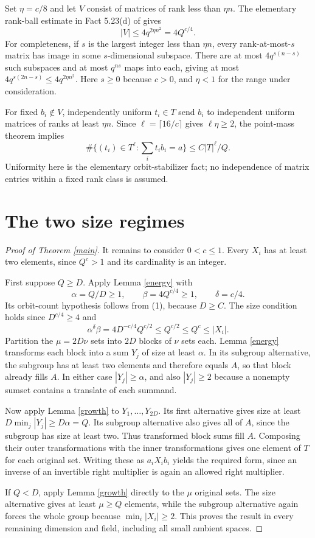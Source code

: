 \documentclass[11pt]{article}
\begin{document}
Set $\eta=c/8$ and let $V$ consist of matrices of rank less than $\eta n$.
The elementary rank-ball estimate in Fact 5.23(d) of \cite{source} gives
\[
 |V|\le4q^{2\eta n^2}=4Q^{c/4}.
\]
For completeness, if $s$ is the largest integer less than $\eta n$,
every rank-at-most-$s$ matrix has image in some $s$-dimensional subspace.
There are at most $4q^{s(n-s)}$ such subspaces and at most $q^{ns}$
maps into each, giving at most $4q^{s(2n-s)}\le4q^{2\eta n^2}$.
Here $s\ge0$ because $c>0$, and $\eta<1$ for the range under consideration.

For fixed $b_i\notin V$, independently uniform $t_i\in T$ send $b_i$
to independent uniform matrices of ranks at least $\eta n$.
Since $\ell=\lceil16/c\rceil$ gives $\ell\eta\ge2$, the point-mass
theorem implies
\[
 \#\{(t_i)\in T^\ell:\sum_i t_ib_i=a\}\le C|T|^\ell/Q.
                                                               \tag{1}
\]
Uniformity here is the elementary orbit-stabilizer fact; no independence
of matrix entries within a fixed rank class is assumed.

\section*{The two size regimes}
\begin{proof}[Proof of Theorem \ref{main}]
It remains to consider $0<c\le1$. Every $X_i$ has at least two elements,
since $Q^c>1$ and its cardinality is an integer.

First suppose $Q\ge D$. Apply Lemma \ref{energy} with
\[
 \alpha=Q/D\ge1,\qquad \beta=4Q^{c/4}\ge1,\qquad \delta=c/4.
\]
Its orbit-count hypothesis follows from (1), because $D\ge C$.
The size condition holds since $D^{c/4}\ge4$ and
\[
 \alpha^\delta\beta
 =4D^{-c/4}Q^{c/2}\le Q^{c/2}\le Q^c\le |X_i|.
\]
Partition the $\mu=2D\nu$ sets into $2D$ blocks of $\nu$ sets each.
Lemma \ref{energy} transforms each block into a sum $Y_j$ of size at
least $\alpha$. In its subgroup alternative, the subgroup has at least
two elements and therefore equals $A$, so that block already fills $A$.
In either case $|Y_j|\ge\alpha$, and also $|Y_j|\ge2$ because a
nonempty sumset contains a translate of each summand.

Now apply Lemma \ref{growth} to $Y_1,\ldots,Y_{2D}$.
Its first alternative gives size at least
$D\min_j|Y_j|\ge D\alpha=Q$. Its subgroup alternative also gives all
of $A$, since the subgroup has size at least two. Thus transformed
block sums fill $A$. Composing their outer transformations with the
inner transformations gives one element of $T$ for each original set.
Writing these as $a_iX_ib_i$ yields the required form, since an inverse
of an invertible right multiplier is again an allowed right multiplier.

If $Q<D$, apply Lemma \ref{growth} directly to the $\mu$ original sets.
The size alternative gives at least $\mu\ge Q$ elements, while the
subgroup alternative again forces the whole group because
$\min_i|X_i|\ge2$. This proves the result in every remaining dimension
and field, including all small ambient spaces.
\end{proof}
\end{document}
